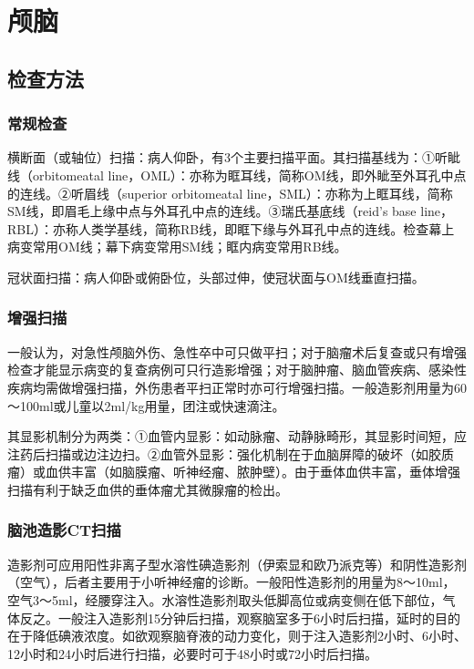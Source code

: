 \chapter{颅脑}

\section{检查方法}

\subsection{常规检查}

横断面（或轴位）扫描：病人仰卧，有3个主要扫描平面。其扫描基线为：①听眦线（orbitomeatal
line，OML）：亦称为眶耳线，简称OM线，即外眦至外耳孔中点的连线。②听眉线（superior
orbitomeatal
line，SML）：亦称为上眶耳线，简称SM线，即眉毛上缘中点与外耳孔中点的连线。③瑞氏基底线（reid's
base
line，RBL）：亦称人类学基线，简称RB线，即眶下缘与外耳孔中点的连线。检查幕上病变常用OM线；幕下病变常用SM线；眶内病变常用RB线。

冠状面扫描：病人仰卧或俯卧位，头部过伸，使冠状面与OM线垂直扫描。

\subsection{增强扫描}

一般认为，对急性颅脑外伤、急性卒中可只做平扫；对于脑瘤术后复查或只有增强检查才能显示病变的复查病例可只行造影增强；对于脑肿瘤、脑血管疾病、感染性疾病均需做增强扫描，外伤患者平扫正常时亦可行增强扫描。一般造影剂用量为60～100ml或儿童以2ml/kg用量，团注或快速滴注。

其显影机制分为两类：①血管内显影：如动脉瘤、动静脉畸形，其显影时间短，应注药后扫描或边注边扫。②血管外显影：强化机制在于血脑屏障的破坏（如胶质瘤）或血供丰富（如脑膜瘤、听神经瘤、脓肿壁）。由于垂体血供丰富，垂体增强扫描有利于缺乏血供的垂体瘤尤其微腺瘤的检出。

\subsection{脑池造影CT扫描}

造影剂可应用阳性非离子型水溶性碘造影剂（伊索显和欧乃派克等）和阴性造影剂（空气），后者主要用于小听神经瘤的诊断。一般阳性造影剂的用量为8～10ml，空气3～5ml，经腰穿注入。水溶性造影剂取头低脚高位或病变侧在低下部位，气体反之。一般注入造影剂15分钟后扫描，观察脑室多于6小时后扫描，延时的目的在于降低碘液浓度。如欲观察脑脊液的动力变化，则于注入造影剂2小时、6小时、12小时和24小时后进行扫描，必要时可于48小时或72小时后扫描。


